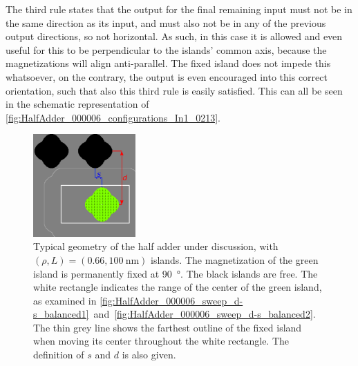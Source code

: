 \documentclass[11pt,a4paper,english]{article}
\begin{document}
The third rule states that the output for the final remaining input must not be in the same direction as its input, and must also not be in any of the previous output directions, so not horizontal. As such, in this case it is allowed and even useful for this to be perpendicular to the islands' common axis, because the magnetizations will align anti-parallel. The fixed island does not impede this whatsoever, on the contrary, the output is even encouraged into this correct orientation, such that also this third rule is easily satisfied. This can all be seen in the schematic representation of \cref{fig:HalfAdder_000006_configurations_In1_0213}.

\begin{figure}
    \centering
    \includegraphics[width=0.35\textwidth]{Figures/half_adder/regions000006.pdf}
    \caption{Typical geometry of the half adder under discussion, with $(\rho, L) = (0.66, \SI{100}{\nano\metre})$ islands. The magnetization of the green island is permanently fixed at \SI{90}{\degree}. The black islands are free. The white rectangle indicates the range of the center of the green island, as examined in \cref{fig:HalfAdder_000006_sweep_d-s_balanced1}~and~\ref{fig:HalfAdder_000006_sweep_d-s_balanced2}. The thin grey line shows the farthest outline of the fixed island when moving its center throughout the white rectangle. The definition of $s$ and $d$ is also given.}
    \label{fig:HalfAdder_000006_geometryTypical}
\end{figure}
\end{document}
